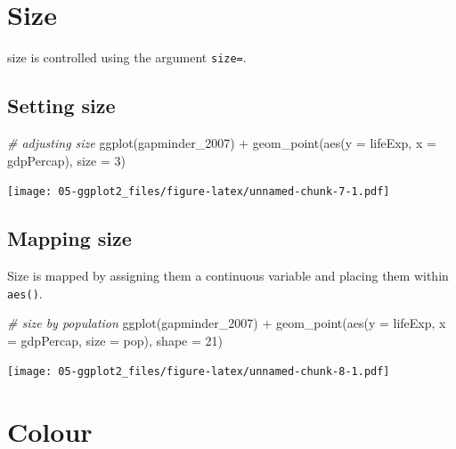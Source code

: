 \documentclass[
]{book}
\newenvironment{Shaded}{\begin{snugshade}}{\end{snugshade}}
\newcommand{\AttributeTok}[1]{\textcolor[rgb]{0.77,0.63,0.00}{#1}}
\newcommand{\CommentTok}[1]{\textcolor[rgb]{0.56,0.35,0.01}{\textit{#1}}}
\newcommand{\DecValTok}[1]{\textcolor[rgb]{0.00,0.00,0.81}{#1}}
\newcommand{\FunctionTok}[1]{\textcolor[rgb]{0.00,0.00,0.00}{#1}}
\newcommand{\NormalTok}[1]{#1}
\newcommand{\SpecialCharTok}[1]{\textcolor[rgb]{0.00,0.00,0.00}{#1}}
\begin{document}
\hypertarget{size}{%
\section{Size}\label{size}}

size is controlled using the argument \texttt{size=}.

\hypertarget{setting-size}{%
\subsection{Setting size}\label{setting-size}}

\begin{Shaded}
\begin{Highlighting}[]
\CommentTok{\# adjusting size}
\FunctionTok{ggplot}\NormalTok{(gapminder\_2007) }\SpecialCharTok{+} 
  \FunctionTok{geom\_point}\NormalTok{(}\FunctionTok{aes}\NormalTok{(}\AttributeTok{y =}\NormalTok{ lifeExp, }\AttributeTok{x =}\NormalTok{ gdpPercap), }\AttributeTok{size =} \DecValTok{3}\NormalTok{)}
\end{Highlighting}
\end{Shaded}

\texttt{[image: 05-ggplot2\_files/figure-latex/unnamed-chunk-7-1.pdf]}

\hypertarget{mapping-size}{%
\subsection{Mapping size}\label{mapping-size}}

Size is mapped by assigning them a continuous variable and placing them within \texttt{aes()}.

\begin{Shaded}
\begin{Highlighting}[]
\CommentTok{\# size by population}
\FunctionTok{ggplot}\NormalTok{(gapminder\_2007) }\SpecialCharTok{+} 
  \FunctionTok{geom\_point}\NormalTok{(}\FunctionTok{aes}\NormalTok{(}\AttributeTok{y =}\NormalTok{ lifeExp, }\AttributeTok{x =}\NormalTok{ gdpPercap, }\AttributeTok{size =}\NormalTok{ pop), }\AttributeTok{shape =} \DecValTok{21}\NormalTok{)}
\end{Highlighting}
\end{Shaded}

\texttt{[image: 05-ggplot2\_files/figure-latex/unnamed-chunk-8-1.pdf]}

\hypertarget{colour}{%
\section{Colour}\label{colour}}
\end{document}
